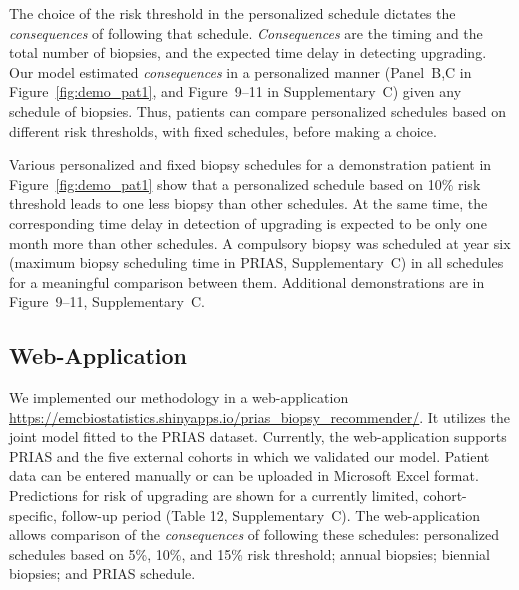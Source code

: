 The choice of the risk threshold in the personalized schedule dictates the \textit{consequences} of following that schedule. \textit{Consequences} are the timing and the total number of biopsies, and the expected time delay in detecting upgrading. Our model estimated \textit{consequences} in a personalized manner (Panel~B,C in Figure~\ref{fig:demo_pat1}, and Figure~9--11 in Supplementary~C) given any schedule of biopsies. Thus, patients can compare personalized schedules based on different risk thresholds, with fixed schedules, before making a choice.

Various personalized and fixed biopsy schedules for a demonstration patient in Figure~\ref{fig:demo_pat1} show that a personalized schedule based on 10\% risk threshold leads to one less biopsy than other schedules. At the same time, the corresponding time delay in detection of upgrading is expected to be only one month more than other schedules. A compulsory biopsy was scheduled at year six (maximum biopsy scheduling time in PRIAS, Supplementary~C) in all schedules for a meaningful comparison between them. Additional demonstrations are in Figure~9--11, Supplementary~C.

\subsection{Web-Application}
We implemented our methodology in a web-application \url{https://emcbiostatistics.shinyapps.io/prias_biopsy_recommender/}. It utilizes the joint model fitted to the PRIAS dataset. Currently, the web-application supports PRIAS and the five external cohorts in which we validated our model. Patient data can be entered manually or can be uploaded in Microsoft Excel format. Predictions for risk of upgrading are shown for a currently limited, cohort-specific, follow-up period (Table 12, Supplementary~C). The web-application allows comparison of the \textit{consequences} of following these schedules: personalized schedules based on 5\%, 10\%, and 15\% risk threshold; annual biopsies; biennial biopsies; and PRIAS schedule.
